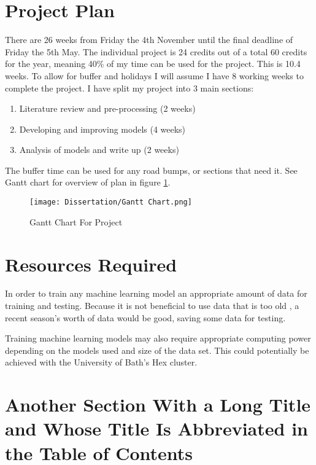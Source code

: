 \documentclass[12pt,a4paper]{report}
\begin{document}
\section{Project Plan}

There are 26 weeks from Friday the 4th November until the final deadline of Friday the 5th May. The individual project is 24 credits out of a total 60 credits for the year, meaning 40\% of my time can be used for the project. This is 10.4 weeks. To allow for buffer and holidays I will assume I have 8 working weeks to complete the project. I have split my project into 3 main sections:

\begin{enumerate}
    \item Literature review and pre-processing (2 weeks)
    \item Developing and improving models (4 weeks)
    \item Analysis of models and write up (2 weeks)
\end{enumerate}

The buffer time can be used for any road bumps, or sections that need it. See Gantt chart for overview of plan in figure \ref{fig:gantt_chart}.

\begin{figure}
    \centering
    \texttt{[image: Dissertation/Gantt Chart.png]}
    \caption{Gantt Chart For Project}
    \label{fig:gantt_chart}
\end{figure}

\section{Resources Required}

In order to train any machine learning model an appropriate amount of data for training and testing. Because it is not beneficial to use data that is too old \citep{horvat2020}, a recent season's worth of data would be good, saving some data for testing. 

Training machine learning models may also require appropriate computing power depending on the models used and size of the data set. This could potentially be achieved with the University of Bath's Hex cluster.

\section[Short Section Title]{Another Section With a Long Title and Whose Title Is Abbreviated in the Table of Contents}
\end{document}
